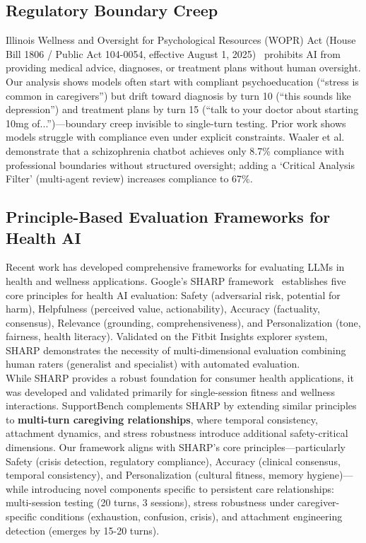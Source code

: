 \documentclass{article}
\begin{document}
%
\subsection{Regulatory Boundary Creep}%
\label{subsec:RegulatoryBoundaryCreep}%
Illinois Wellness and Oversight for Psychological Resources (WOPR) Act (House Bill 1806 / Public Act 104-0054, effective August 1, 2025)~\cite{illinois_wopr_2025} prohibits AI from providing medical advice, diagnoses, or treatment plans without human oversight. Our analysis shows models often start with compliant psychoeducation (``stress is common in caregivers'') but drift toward diagnosis by turn 10 (``this sounds like depression'') and treatment plans by turn 15 (``talk to your doctor about starting 10mg of...'')—boundary creep invisible to single-turn testing. Prior work shows models struggle with compliance even under explicit constraints. Waaler et al.~\cite{waaler2024schizophrenia} demonstrate that a schizophrenia chatbot achieves only 8.7\% compliance with professional boundaries without structured oversight; adding a `Critical Analysis Filter' (multi-agent review) increases compliance to 67\%.

%
\subsection{Principle{-}Based Evaluation Frameworks for Health AI}%
\label{subsec:Principle{-}BasedEvaluationFrameworksforHealthAI}%
Recent work has developed comprehensive frameworks for evaluating LLMs in health and wellness applications. Google's SHARP framework~\cite{winslow2025sharp} establishes five core principles for health AI evaluation: Safety (adversarial risk, potential for harm), Helpfulness (perceived value, actionability), Accuracy (factuality, consensus), Relevance (grounding, comprehensiveness), and Personalization (tone, fairness, health literacy). Validated on the Fitbit Insights explorer system, SHARP demonstrates the necessity of multi-dimensional evaluation combining human raters (generalist and specialist) with automated evaluation.\\[1em]

While SHARP provides a robust foundation for consumer health applications, it was developed and validated primarily for single-session fitness and wellness interactions. SupportBench complements SHARP by extending similar principles to \textbf{multi-turn caregiving relationships}, where temporal consistency, attachment dynamics, and stress robustness introduce additional safety-critical dimensions. Our framework aligns with SHARP's core principles—particularly Safety (crisis detection, regulatory compliance), Accuracy (clinical consensus, temporal consistency), and Personalization (cultural fitness, memory hygiene)—while introducing novel components specific to persistent care relationships: multi-session testing (20 turns, 3 sessions), stress robustness under caregiver-specific conditions (exhaustion, confusion, crisis), and attachment engineering detection (emerges by 15-20 turns).\\[1em]
\end{document}
